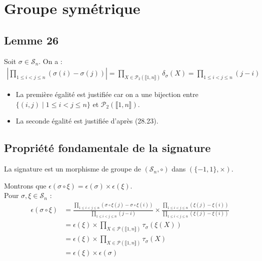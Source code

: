 \documentclass[../main.tex]{subfiles}
\begin{document}
\setcounter{chapter}{28}
\chapter{Groupe symétrique}
\tableofcontents
\clearpage

\section{Lemme 26}
\begin{tcolorbox}[title=Lemme 29.26, title filled=false, colframe=orange, colback=orange!10!white]
    Soit $\sigma\in \mathcal{S}_n$. On a : 
    \begin{align*}
        \left| \prod_{1\leq i < j \leq n} (\sigma(i) - \sigma(j)) \right| = \prod_{X\in \mathcal{P}_2(\llbracket 1, n \rrbracket)} \delta_{\sigma} (X) = \prod_{1\leq i < j \leq n} (j - i)
    \end{align*}
\end{tcolorbox}

\begin{itemize}
    \item La première égalité est justifiée car on a une bijection entre $\{ (i, j) \mid 1 \leq i < j \leq n \}$ et $\mathcal{P}_2(\llbracket 1, n \rrbracket)$. 
    \item La seconde égalité est justifiée d'après (28.23). 
\end{itemize}

\section{Propriété fondamentale de la signature}
\begin{tcolorbox}[title=Théorème 29.29, title filled=false, colframe=orange, colback=orange!10!white]
    La signature est un morphisme de groupe de $(\mathcal{S}_n, \circ)$ dans $(\{-1, 1\}, \times)$. 
\end{tcolorbox}

Montrons que $\epsilon(\sigma \circ \xi) = \epsilon(\sigma) \times \epsilon(\xi)$. \\
Pour $\sigma, \xi \in \mathcal{S}_n$ : 
\begin{align*}
    \epsilon(\sigma\circ\xi) &= \frac{\prod\limits_{1\leq i < j\leq n} (\sigma\circ\xi(j) - \sigma\circ\xi(i))}{\prod\limits_{1\leq i < j\leq n} (j - i)} \times \frac{\prod\limits_{1\leq i < j\leq n} (\xi(j) - \xi(i))}{\prod\limits_{1\leq i < j\leq n} (\xi(j) - \xi(i))} \\
    &= \epsilon(\xi) \times \prod_{X\in \mathcal{P}(\llbracket 1, n \rrbracket)} \tau_\sigma (\xi(X)) \\
    &= \epsilon(\xi) \times \prod_{X\in \mathcal{P}(\llbracket 1, n \rrbracket)} \tau_\sigma (X) \\
    &= \epsilon(\xi) \times \epsilon(\sigma)
\end{align*}
\end{document}
